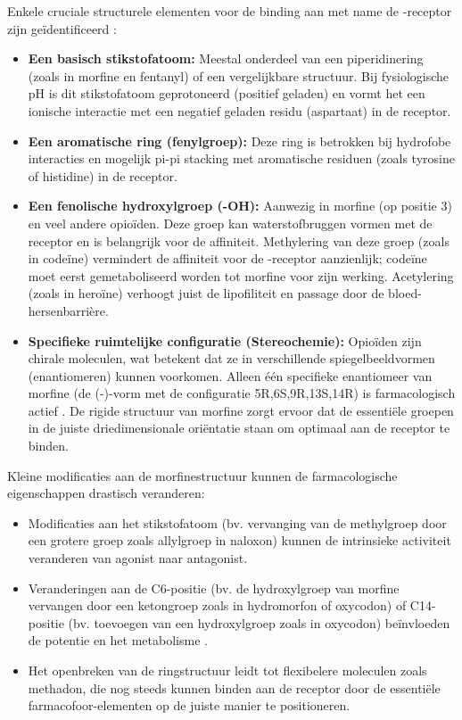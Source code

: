 \documentclass[11pt, a4paper]{report} %
\begin{document}
Enkele cruciale structurele elementen voor de binding aan met name de \textmu-receptor zijn geïdentificeerd \parencite{IUPHAROpioidReceptors, PMC2019MolecularBasis}:
\begin{itemize}
    \item \textbf{Een basisch stikstofatoom:} Meestal onderdeel van een piperidinering (zoals in morfine en fentanyl) of een vergelijkbare structuur. Bij fysiologische pH is dit stikstofatoom geprotoneerd (positief geladen) en vormt het een ionische interactie met een negatief geladen residu (aspartaat) in de receptor.
    \item \textbf{Een aromatische ring (fenylgroep):} Deze ring is betrokken bij hydrofobe interacties en mogelijk pi-pi stacking met aromatische residuen (zoals tyrosine of histidine) in de receptor.
    \item \textbf{Een fenolische hydroxylgroep (-OH):} Aanwezig in morfine (op positie 3) en veel andere opioïden. Deze groep kan waterstofbruggen vormen met de receptor en is belangrijk voor de affiniteit. Methylering van deze groep (zoals in codeïne) vermindert de affiniteit voor de \textmu-receptor aanzienlijk; codeïne moet eerst gemetaboliseerd worden tot morfine voor zijn werking. Acetylering (zoals in heroïne) verhoogt juist de lipofiliteit en passage door de bloed-hersenbarrière.
    \item \textbf{Specifieke ruimtelijke configuratie (Stereochemie):} Opioïden zijn chirale moleculen, wat betekent dat ze in verschillende spiegelbeeldvormen (enantiomeren) kunnen voorkomen. Alleen één specifieke enantiomeer van morfine (de (-)-vorm met de configuratie 5R,6S,9R,13S,14R) is farmacologisch actief \parencite{NewsMedicalMorphineChem}. De rigide structuur van morfine zorgt ervoor dat de essentiële groepen in de juiste driedimensionale oriëntatie staan om optimaal aan de receptor te binden.
\end{itemize}
Kleine modificaties aan de morfinestructuur kunnen de farmacologische eigenschappen drastisch veranderen:
\begin{itemize}
    \item Modificaties aan het stikstofatoom (bv. vervanging van de methylgroep door een grotere groep zoals allylgroep in naloxon) kunnen de intrinsieke activiteit veranderen van agonist naar antagonist.
    \item Veranderingen aan de C6-positie (bv. de hydroxylgroep van morfine vervangen door een ketongroep zoals in hydromorfon of oxycodon) of C14-positie (bv. toevoegen van een hydroxylgroep zoals in oxycodon) beïnvloeden de potentie en het metabolisme \parencite{PubChemOxycodone}.
    \item Het openbreken van de ringstructuur leidt tot flexibelere moleculen zoals methadon, die nog steeds kunnen binden aan de receptor door de essentiële farmacofoor-elementen op de juiste manier te positioneren.
\end{itemize}
\end{document}
